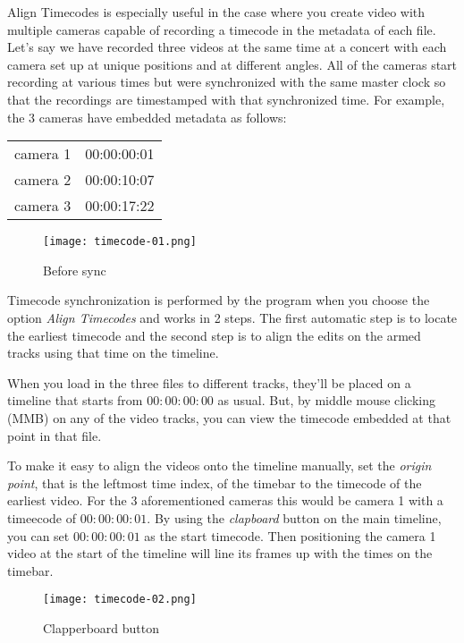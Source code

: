 Align Timecodes is especially useful in the case where you create video with multiple cameras capable of recording a timecode in the metadata of each file.  Let’s say we have recorded three videos at the same time at a concert with each camera set up at unique positions and at different angles.   All of the cameras start recording at various times but were synchronized with the same master clock so that the recordings are timestamped with that synchronized time.  For example, the 3 cameras have embedded metadata as follows:

\begin{center}
	\begin{tabular}{l r}
	camera 1 & 00:00:00:01 \\
	camera 2 & 00:00:10:07 \\
	camera 3 & 00:00:17:22 \\
	\end{tabular}
\end{center}

\begin{figure}[ht]
	\centering
	\texttt{[image: timecode-01.png]}
	\caption{Before sync}
	\label{fig:timecode-01}
\end{figure}

Timecode synchronization is performed by the program when you choose the option \textit{Align Timecodes} and works in 2 steps. The first automatic step is to locate the earliest timecode and the second step is to align the edits on the armed tracks using that time on the timeline. 

When you load in the three files to different tracks, they'll be placed on a timeline that starts from $00:00:00:00$ as usual. But, by middle mouse clicking (MMB) on any of the video tracks, you can view the timecode embedded at that point in that file.

To make it easy to align the videos onto the timeline manually, set the \textit{origin point}, that is the leftmost time index, of the timebar to the timecode of the earliest video.  For the 3 aforementioned cameras this would be camera 1 with a timeecode of $00:00:00:01$.  By using the \textit{clapboard} button on the main timeline, you can set $00:00:00:01$ as the start timecode. Then positioning the camera 1 video at the start of the timeline will line its frames up with the times on the timebar.

\begin{figure}[ht]
	\centering
	\texttt{[image: timecode-02.png]}
	\caption{Clapperboard button}
	\label{fig:timecode-02}
\end{figure}

